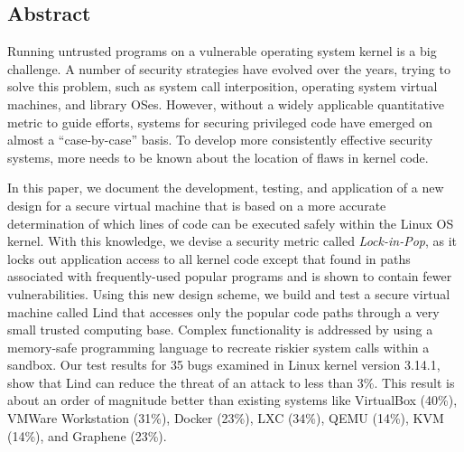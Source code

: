 \subsection*{Abstract}

Running untrusted programs on a vulnerable operating system kernel is a big challenge. 
A number of security strategies have evolved over the years, trying to solve this problem, 
such as system call interposition, operating system virtual machines, and library OSes. 
However, without a widely applicable quantitative metric to guide efforts, systems for securing privileged code 
have emerged on almost a ``case-by-case'' basis. To develop more consistently effective security systems, 
more needs to be known about the location of flaws in kernel code.

In this paper, we document the development, testing, and application of a new design for a secure virtual machine 
that is based on a more accurate determination of which lines of code can be executed safely within the Linux OS kernel. 
With this knowledge, we devise a security metric called \emph{Lock-in-Pop}, as it locks out application access to all kernel code 
except that found in paths associated with frequently-used popular programs and is shown to contain fewer vulnerabilities. 
Using this new design scheme, we build and test  a secure virtual machine called Lind that accesses only 
the popular code paths through a very small trusted computing base. Complex functionality is addressed 
by using a memory-safe programming language to recreate riskier system calls within a sandbox. 
Our test results for 35 bugs examined in Linux kernel version 3.14.1, show that Lind can reduce the threat of an attack to less than 3\%. 
This result is about an order of magnitude better than existing systems like VirtualBox (40\%), VMWare Workstation (31\%), Docker (23\%), 
LXC (34\%), QEMU (14\%), KVM (14\%), and Graphene (23\%).